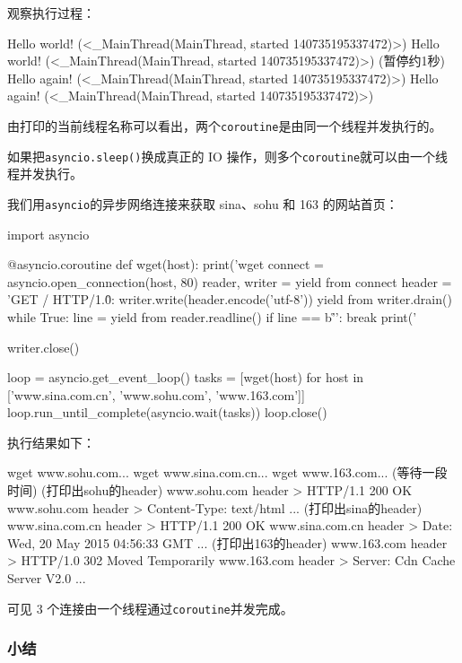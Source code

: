 观察执行过程：

\begin{pythoncode}
Hello world! (<_MainThread(MainThread, started 140735195337472)>)
Hello world! (<_MainThread(MainThread, started 140735195337472)>)
(暂停约1秒)
Hello again! (<_MainThread(MainThread, started 140735195337472)>)
Hello again! (<_MainThread(MainThread, started 140735195337472)>)
\end{pythoncode}

由打印的当前线程名称可以看出，两个\texttt{coroutine}是由同一个线程并发执行的。

如果把\texttt{asyncio.sleep()}换成真正的 IO
操作，则多个\texttt{coroutine}就可以由一个线程并发执行。

我们用\texttt{asyncio}的异步网络连接来获取 sina、sohu 和 163
的网站首页：

\begin{pythoncode}
import asyncio

@asyncio.coroutine
def wget(host):
    print('wget %
    connect = asyncio.open_connection(host, 80)
    reader, writer = yield from connect
    header = 'GET / HTTP/1.0\r\nHost: %
    writer.write(header.encode('utf-8'))
    yield from writer.drain()
    while True:
        line = yield from reader.readline()
        if line == b'\r\n':
            break
        print('%
    
    writer.close()

loop = asyncio.get_event_loop()
tasks = [wget(host) for host in ['www.sina.com.cn', 'www.sohu.com', 'www.163.com']]
loop.run_until_complete(asyncio.wait(tasks))
loop.close()
\end{pythoncode}

执行结果如下：

\begin{pythoncode}
wget www.sohu.com...
wget www.sina.com.cn...
wget www.163.com...
(等待一段时间)
(打印出sohu的header)
www.sohu.com header > HTTP/1.1 200 OK
www.sohu.com header > Content-Type: text/html
...
(打印出sina的header)
www.sina.com.cn header > HTTP/1.1 200 OK
www.sina.com.cn header > Date: Wed, 20 May 2015 04:56:33 GMT
...
(打印出163的header)
www.163.com header > HTTP/1.0 302 Moved Temporarily
www.163.com header > Server: Cdn Cache Server V2.0
...
\end{pythoncode}

可见 3 个连接由一个线程通过\texttt{coroutine}并发完成。

\hypertarget{ux5c0fux7ed3}{%
\subsubsection{小结}\label{ux5c0fux7ed3}}

